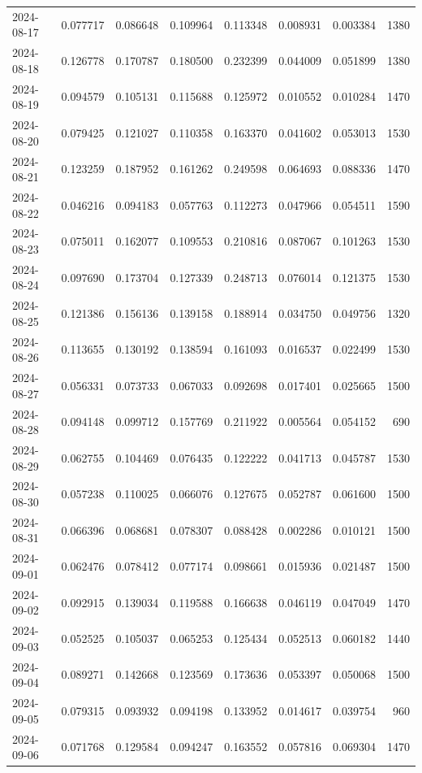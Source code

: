 \begin{tabular}{lrrrrrrr}
2024-08-17 & 0.077717 & 0.086648 & 0.109964 & 0.113348 & 0.008931 & 0.003384 & 1380 \\
2024-08-18 & 0.126778 & 0.170787 & 0.180500 & 0.232399 & 0.044009 & 0.051899 & 1380 \\
2024-08-19 & 0.094579 & 0.105131 & 0.115688 & 0.125972 & 0.010552 & 0.010284 & 1470 \\
2024-08-20 & 0.079425 & 0.121027 & 0.110358 & 0.163370 & 0.041602 & 0.053013 & 1530 \\
2024-08-21 & 0.123259 & 0.187952 & 0.161262 & 0.249598 & 0.064693 & 0.088336 & 1470 \\
2024-08-22 & 0.046216 & 0.094183 & 0.057763 & 0.112273 & 0.047966 & 0.054511 & 1590 \\
2024-08-23 & 0.075011 & 0.162077 & 0.109553 & 0.210816 & 0.087067 & 0.101263 & 1530 \\
2024-08-24 & 0.097690 & 0.173704 & 0.127339 & 0.248713 & 0.076014 & 0.121375 & 1530 \\
2024-08-25 & 0.121386 & 0.156136 & 0.139158 & 0.188914 & 0.034750 & 0.049756 & 1320 \\
2024-08-26 & 0.113655 & 0.130192 & 0.138594 & 0.161093 & 0.016537 & 0.022499 & 1530 \\
2024-08-27 & 0.056331 & 0.073733 & 0.067033 & 0.092698 & 0.017401 & 0.025665 & 1500 \\
2024-08-28 & 0.094148 & 0.099712 & 0.157769 & 0.211922 & 0.005564 & 0.054152 & 690 \\
2024-08-29 & 0.062755 & 0.104469 & 0.076435 & 0.122222 & 0.041713 & 0.045787 & 1530 \\
2024-08-30 & 0.057238 & 0.110025 & 0.066076 & 0.127675 & 0.052787 & 0.061600 & 1500 \\
2024-08-31 & 0.066396 & 0.068681 & 0.078307 & 0.088428 & 0.002286 & 0.010121 & 1500 \\
2024-09-01 & 0.062476 & 0.078412 & 0.077174 & 0.098661 & 0.015936 & 0.021487 & 1500 \\
2024-09-02 & 0.092915 & 0.139034 & 0.119588 & 0.166638 & 0.046119 & 0.047049 & 1470 \\
2024-09-03 & 0.052525 & 0.105037 & 0.065253 & 0.125434 & 0.052513 & 0.060182 & 1440 \\
2024-09-04 & 0.089271 & 0.142668 & 0.123569 & 0.173636 & 0.053397 & 0.050068 & 1500 \\
2024-09-05 & 0.079315 & 0.093932 & 0.094198 & 0.133952 & 0.014617 & 0.039754 & 960 \\
2024-09-06 & 0.071768 & 0.129584 & 0.094247 & 0.163552 & 0.057816 & 0.069304 & 1470 \\

\end{tabular}
